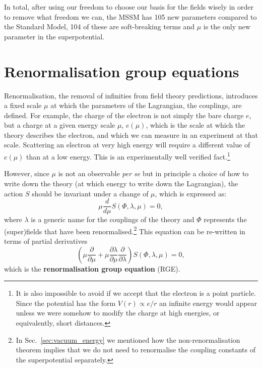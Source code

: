 \documentclass[notes.tex]{subfiles}
\begin{document}
In total, after using our freedom to choose our basis for the fields wisely in order to remove what freedom we can, the MSSM has 105 new parameters compared to the Standard Model, 104 of these are soft-breaking terms and $\mu$ is the only new parameter in the superpotential.



\section{Renormalisation group equations}
\label{sec:RGE}
Renormalisation, the removal of infinities from field theory predictions, introduces a fixed scale $\mu$ at which the parameters of the Lagrangian, the couplings, are defined. For example, the charge of the electron is not simply the bare charge $e$, but a charge at a given energy scale $\mu$, $e(\mu)$, which is the scale at which the theory describes the electron, and which we can measure in an experiment at that scale. Scattering an electron at very high energy will  require a different value of $e(\mu)$ than at a low energy. This is an experimentally well verified fact.\footnote{It is also impossible to avoid if we accept that the electron is a point particle. Since the potential has the form $V(r)\propto e/r$ an infinite energy would appear unless we were somehow to modify the charge at high energies, or equivalently, short distances.}

However, since $\mu$ is not an observable {\it per se} but in principle a choice of how to write down the theory (at which energy to write down the Lagrangian), the action $S$ should be invariant under a change of $\mu$, which is expressed as:
\begin{equation}
\mu \frac{d}{d\mu}S(\Phi, \lambda, \mu) = 0,
\end{equation}
where $\lambda$ is a generic name for the couplings of the theory and $\Phi$ represents the (super)fields that have been renormalised.\footnote{In Sec.~\ref{sec:vacuum_energy} we mentioned how the non-renormalisation theorem implies that we do not need to renormalise the coupling constants of the superpotential separately.} This equation can be re-written in terms of partial derivatives
\begin{equation}
\left(\mu \frac{\partial}{\partial \mu} + \mu \frac{\partial \lambda}{\partial \mu} \frac{\partial}{\partial\lambda}\right)S(\Phi, \lambda, \mu)=0,
\end{equation}
which is the {\bf renormalisation group equation} (RGE). 
\end{document}

